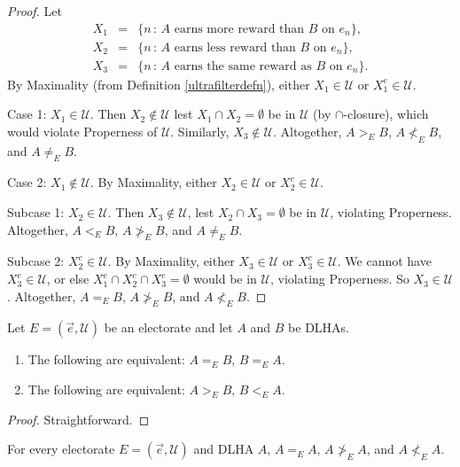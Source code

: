 \documentclass[twoside,11pt]{article}
\begin{document}
\begin{proof}
    Let
    \begin{eqnarray*}
        X_1 &=& \{n\,:\,\mbox{$A$ earns more reward than $B$ on $e_n$}\},\\
        X_2 &=& \{n\,:\,\mbox{$A$ earns less reward than $B$ on $e_n$}\},\\
        X_3 &=& \{n\,:\,\mbox{$A$ earns the same reward as $B$ on $e_n$}\}.
    \end{eqnarray*}
    By Maximality (from Definition \ref{ultrafilterdefn}),
    either $X_1\in \mathscr U$ or $X_1^c\in\mathscr U$.

    Case 1: $X_1\in\mathscr U$. Then $X_2\not\in\mathscr U$ lest $X_1\cap X_2=\emptyset$ be in
    $\mathscr U$ (by $\cap$-closure), which would violate Properness of $\mathscr U$.
    Similarly, $X_3\not\in\mathscr U$. Altogether, $A>_{E}B$,
    $A\not<_{E}B$, and $A\neq_{E}B$.

    Case 2: $X_1\not\in\mathscr U$.
    By Maximality, either $X_2\in\mathscr U$ or $X_2^c\in\mathscr U$.

    Subcase 1: $X_2\in\mathscr U$. Then $X_3\not\in\mathscr U$, lest $X_2\cap X_3=\emptyset$
    be in $\mathscr U$, violating Properness. Altogether, $A<_{E}B$,
    $A\not>_{E}B$, and $A\neq_{E}B$.

    Subcase 2: $X_2^c\in\mathscr U$. By Maximality, either $X_3\in\mathscr U$ or
    $X_3^c\in\mathscr U$. We cannot have $X_3^c\in\mathscr U$, or else
    $X_1^c\cap X_2^c\cap X_3^c=\emptyset$
    would be in $\mathscr U$, violating Properness. So $X_3\in\mathscr U$.
    Altogether, $A=_{E}B$, $A\not>_{E}B$, and $A\not<_{E}B$.
\end{proof}

\begin{lemma}
    Let $E=(\vec{e},\mathscr U)$ be an electorate and let $A$ and $B$ be DLHAs.
    \begin{enumerate}
        \item The following are equivalent: $A=_{E}B$, $B=_{E}A$.
        \item The following are equivalent: $A>_{E}B$, $B<_{E}A$.
    \end{enumerate}
\end{lemma}

\begin{proof}
Straightforward.
\end{proof}

\begin{lemma}
    For every electorate $E=(\vec{e},\mathscr U)$ and DLHA $A$,
    $A=_{E}A$, $A\not>_{E}A$, and $A\not<_{E}A$.
\end{lemma}
\end{document}
